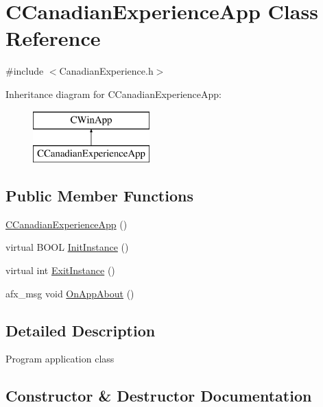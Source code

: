\hypertarget{class_c_canadian_experience_app}{}\section{C\+Canadian\+Experience\+App Class Reference}
\label{class_c_canadian_experience_app}


{\ttfamily \#include $<$Canadian\+Experience.\+h$>$}

Inheritance diagram for C\+Canadian\+Experience\+App\+:\begin{figure}[H]
\begin{center}
\leavevmode
\includegraphics[height=2.000000cm]{class_c_canadian_experience_app}
\end{center}
\end{figure}
\subsection*{Public Member Functions}
\begin{DoxyCompactItemize}
\item 
\hyperlink{class_c_canadian_experience_app_a8a2d61bf478a5b12004e4f0d3c0c442a}{C\+Canadian\+Experience\+App} ()
\item 
virtual B\+O\+O\+L \hyperlink{class_c_canadian_experience_app_ab821deed5758f650a2fbbc65cefc8cc7}{Init\+Instance} ()
\item 
virtual int \hyperlink{class_c_canadian_experience_app_a289a9574888e0c922c455e73edf424ad}{Exit\+Instance} ()
\item 
afx\+\_\+msg void \hyperlink{class_c_canadian_experience_app_a99cb24a35f65d5821f7e09eefb0c97e7}{On\+App\+About} ()
\end{DoxyCompactItemize}


\subsection{Detailed Description}
Program application class 

\subsection{Constructor \& Destructor Documentation}
\hypertarget{class_c_canadian_experience_app_a8a2d61bf478a5b12004e4f0d3c0c442a}{}
